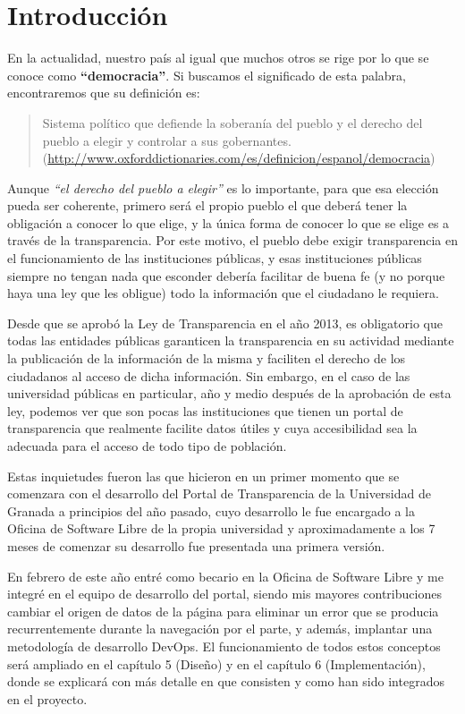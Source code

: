 \chapter{Introducción}

En la actualidad, nuestro país al igual que muchos otros se rige por lo que se conoce como \textbf{``democracia''}. Si buscamos
el significado de esta palabra, encontraremos que su definición es: 

\begin{quote}Sistema político que defiende la soberanía del pueblo y el derecho del pueblo a elegir y controlar a sus 
gobernantes.
\newline(\url{http://www.oxforddictionaries.com/es/definicion/espanol/democracia})
\end{quote}

Aunque \textit{``el derecho del pueblo a elegir''} es lo importante, para que esa elección pueda ser coherente, primero será el propio
pueblo el que deberá tener la obligación a conocer lo que elige, y la única forma de conocer lo que se elige es a través de la
transparencia. Por este motivo, el pueblo debe exigir transparencia en el funcionamiento de las instituciones públicas, y esas
instituciones públicas siempre no tengan nada que esconder debería facilitar de buena fe (y no porque haya una ley que les 
obligue) todo la información que el ciudadano le requiera.

\bigskip
Desde que se aprobó la Ley de Transparencia en el año 2013, es obligatorio que todas las entidades públicas garanticen la
transparencia en su actividad mediante la publicación de la información de la misma y faciliten el derecho de los ciudadanos al
acceso de dicha información. Sin embargo, en el caso de las universidad públicas en particular, año y medio después de la 
aprobación de esta ley, podemos ver que son pocas las instituciones que tienen un portal de transparencia que realmente 
facilite datos útiles y cuya accesibilidad sea la adecuada para el acceso de todo tipo de población.

\bigskip
Estas inquietudes fueron las que hicieron en un primer momento que se comenzara con el desarrollo del Portal de Transparencia
de la Universidad de Granada a principios del año pasado, cuyo desarrollo le fue encargado a la Oficina de Software Libre de la propia universidad y 
aproximadamente a los 7 meses de comenzar su desarrollo fue presentada una primera versión.

\bigskip
En febrero de este año entré como becario en la Oficina de Software Libre y me integré en el equipo de desarrollo del portal,
siendo mis mayores contribuciones cambiar el origen de datos de la página para eliminar un error que se producia recurrentemente
durante la navegación por el parte, y además, implantar una metodología de desarrollo DevOps. El funcionamiento de todos estos 
conceptos será ampliado en el capítulo 5 (Diseño) y en el capítulo 6 (Implementación), donde se explicará con más detalle en 
que consisten y como han sido integrados en el proyecto.

